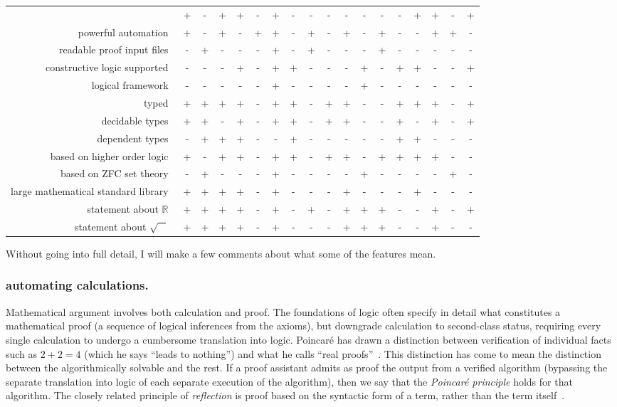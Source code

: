 \documentclass{llncs}
\newcommand{\ring}[1]{\mathbb{#1}}
\begin{document}
\begin{tabular}{|r|ccccc|ccccc|ccccc|cc|}
&+ &- &+ &+  &- &+ &- &-  &- &- &- &-  &- &+ &+ &-  &+ 
\\
powerful automation~
&+ &- &+ &-  &+ &+ &- &+  &- &+ &- &+  &- &- &+ &+  &- 
\\
readable proof input files~
&- &+ &- &-  &- &+ &- &+  &- &- &- &+  &- &- &- &-  &- 
\\
\hline
constructive logic supported~
&- &- &- &+  &- &+ &+ &-  &- &- &+ &-  &+ &+ &- &-  &+ 
\\
logical framework~
&- &- &- &-  &- &+ &- &-  &- &- &+ &-  &- &- &- &-  &- 
\\
typed~
&+ &+ &+ &+  &- &+ &+ &-  &+ &+ &- &-  &+ &+ &+ &-  &+ 
\\
decidable types~
&+ &+ &- &+  &- &+ &+ &-  &+ &+ &- &-  &+ &- &+ &-  &+ 
\\
dependent types~
&- &+ &+ &+  &- &- &+ &-  &- &- &- &-  &+ &+ &- &-  &- 
\\
\hline
based on higher order logic~
&+ &- &+ &+  &- &+ &+ &-  &+ &+ &- &+  &+ &+ &+ &-  &- 
\\
based on ZFC set theory~
&- &+ &- &-  &- &+ &- &-  &- &- &+ &-  &- &- &- &+  &- 
\\
large mathematical standard library~
&+ &+ &+ &+  &- &+ &- &-  &- &+ &- &-  &- &+ &- &-  &- 
\\
statement about $\ring{R}$~
&+ &+ &+ &+  &- &+ &- &+  &- &+ &+ &+  &- &- &+ &-  &+ 
\\
statement about $\sqrt{\phantom X}$~
&+ &+ &+ &+  &- &+ &- &-  &- &+ &+ &+  &- &- &+ &-  &- 
\\
\hline
\end{tabular}


\bigskip
Without going into full detail, I will make a few comments about what
some of the features mean.

\subsubsection{automating calculations.} Mathematical argument
involves both calculation and proof.  The foundations of logic often
specify in detail what constitutes a mathematical proof (a sequence of
logical inferences from the axioms), but downgrade calculation to
second-class status, requiring every single calculation to undergo a
cumbersome translation into logic.  Poincar\'e has drawn a distinction
between verification of individual facts such as $2+2=4$ (which he
says ``leads to nothing'') and what he calls ``real proofs''~\cite[p.~4]{HPSH}.
This distinction has come to mean the distinction between the
algorithmically solvable and the rest.  If a proof assistant
admits as proof the output from a verified algorithm (bypassing the
separate translation into logic of each separate execution of the
algorithm), then we say that the {\it Poincar\'e principle} holds for
that algorithm.  The closely related principle of {\it reflection}
is proof based on the syntactic form of a term, rather than the
term itself~\cite{BFM}.
\end{document}
